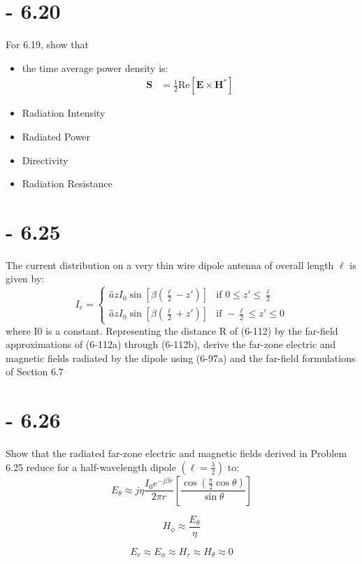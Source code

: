 \documentclass[12pt]{article}
\begin{document}
\section{- 6.20}
For 6.19, show that
\begin{itemize}
\item the time average power density is:
  \begin{align*}
    \mathbf{S} &= \frac{1}{2}\text{Re}{[\mathbf{E}\times\mathbf{H}^*]}%
  \end{align*}
\item Radiation Intensity
\item Radiated Power
\item Directivity
\item Radiation Resistance
\end{itemize}

\section{- 6.25}
The current distribution on a very thin wire dipole antenna of overall length $\ell$ is given by:
\[
I_e = 
\begin{cases} 
\hat{a} z I_0 \sin [\beta\left(\frac{\ell}{2} - z'\right)] & \text{if } 0 \leq z' \leq \frac{\ell}{2} \\
\hat{a} z I_0 \sin [\beta\left(\frac{\ell}{2} + z'\right)] & \text{if } -\frac{\ell}{2} \leq z' \leq 0
\end{cases}
\]
where I0 is a constant. Representing the distance R of (6-112) by the far-field approximations of (6-112a) through (6-112b), derive the far-zone electric and magnetic fields radiated by the dipole using (6-97a) and the far-field formulations of Section 6.7


\section{- 6.26}
 Show that the radiated far-zone electric and magnetic fields derived in Problem 6.25 reduce for a half-wavelength dipole $(\ell = \frac{\lambda}{2})$ to:
\[
E_{\theta} \approx j \eta \frac{I_0 e^{-j \beta r}}{2\pi r} 
\left[\frac{\cos\left(\frac{\pi}{2} \cos \theta\right)}{
\sin \theta}\right]
\]

\[
H_{\phi} \approx \frac{E_{\theta}}{\eta}
\]

\[
E_r \approx E_{\phi} \approx H_r \approx H_{\theta} \approx 0
\]

 
\end{document}
